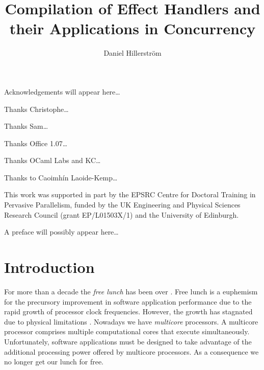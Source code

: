 \documentclass[12pt,mscres,cdtppar,twoside,openright,logo,rightchapter,normalheadings]{infthesis}
\title{Compilation of Effect Handlers and their Applications in Concurrency}
\author{Daniel Hillerström}
\theoremstyle{definition}
\begin{document}
\raggedbottom
\begin{preliminary}

\maketitle

\begin{acknowledgements}
Acknowledgements will appear here\dots

Thanks Christophe\dots

Thanks Sam\dots

Thanks Office 1.07\dots

Thanks OCaml Labs and KC\dots

Thanks to Caoimhín Laoide-Kemp\dots

This work was supported in part by the EPSRC Centre for Doctoral Training in Pervasive Parallelism, funded by the UK Engineering and Physical Sciences Research Council (grant EP/L01503X/1) and the University of Edinburgh.
\end{acknowledgements}

\standarddeclaration


\begin{preface}
A preface will possibly appear here\dots
\end{preface}

\setcounter{secnumdepth}{2} %
\setcounter{tocdepth}{3} %
\tableofcontents

\end{preliminary}


\chapter{Introduction}
\label{ch:introduction}

For more than a decade the \emph{free lunch} has been over
\citep{Sutter2005}. Free lunch is a euphemism for the precursory
improvement in software application performance due to the rapid
growth of processor clock frequencies. However, the growth has
stagnated due to physical limitations \citep{Sutter2005}.
%
Nowadays we have \emph{multicore} processors. A multicore processor
comprises multiple computational cores that execute
simultaneously. Unfortunately, software applications must be designed
to take advantage of the additional processing power offered by
multicore processors. As a consequence we no longer get our lunch for
free.
\end{document}
